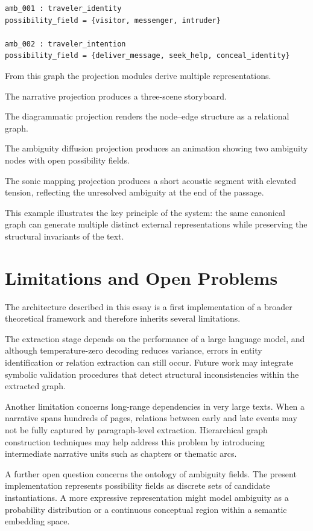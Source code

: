 \documentclass[12pt, a4paper]{article}
\begin{document}
\begin{verbatim}
amb_001 : traveler_identity
possibility_field = {visitor, messenger, intruder}

amb_002 : traveler_intention
possibility_field = {deliver_message, seek_help, conceal_identity}
\end{verbatim}

From this graph the projection modules derive multiple representations.

The narrative projection produces a three-scene storyboard.

The diagrammatic projection renders the node–edge structure as a relational graph.

The ambiguity diffusion projection produces an animation showing two ambiguity nodes with open possibility fields.

The sonic mapping projection produces a short acoustic segment with elevated tension, reflecting the unresolved ambiguity at the end of the passage.

This example illustrates the key principle of the system: the same canonical graph can generate multiple distinct external representations while preserving the structural invariants of the text.

\section{Limitations and Open Problems}

The architecture described in this essay is a first implementation of a broader theoretical framework and therefore inherits several limitations.

The extraction stage depends on the performance of a large language model, and although temperature-zero decoding reduces variance, errors in entity identification or relation extraction can still occur. Future work may integrate symbolic validation procedures that detect structural inconsistencies within the extracted graph.

Another limitation concerns long-range dependencies in very large texts. When a narrative spans hundreds of pages, relations between early and late events may not be fully captured by paragraph-level extraction. Hierarchical graph construction techniques may help address this problem by introducing intermediate narrative units such as chapters or thematic arcs.

A further open question concerns the ontology of ambiguity fields. The present implementation represents possibility fields as discrete sets of candidate instantiations. A more expressive representation might model ambiguity as a probability distribution or a continuous conceptual region within a semantic embedding space.
\end{document}
